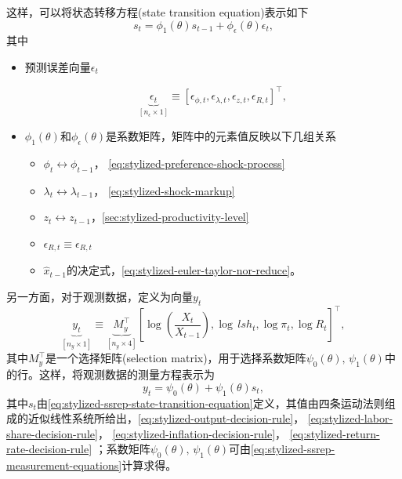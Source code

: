 这样，可以将状态转移方程(state transition equation)表示如下
\begin{equation}
  \label{eq:stylized-ssrep-state-transition-equation}
  s_{t} = \phi_{1} \left( \theta \right) s_{t-1} + \phi_{\epsilon} \left( \theta \right) \epsilon_{t},
\end{equation}
其中
\begin{itemize}
  \item  预测误差向量$\epsilon_{t}$

  \begin{equation*}
    \underbrace{
    \epsilon_{t}
    }_{\left[ n_{\epsilon} \times 1 \right]}
    \equiv \left[ \epsilon_{\phi,t}, \epsilon_{\lambda,t}, \epsilon_{z,t}, \epsilon_{R,t} \right]^{\top},
  \end{equation*}
    \item $\phi_{1} \left( \theta \right)$和$\phi_{\epsilon} \left( \theta \right)$是系数矩阵，矩阵中的元素值反映以下几组关系
    \begin{itemize}
      \item $\phi_{t} \leftrightarrow \phi_{t-1}$， \eqref{eq:stylized-preference-shock-process}
      \item $\lambda_{t} \leftrightarrow \lambda_{t-1}$， \eqref{eq:stylized-shock-markup}
      \item $z_{t} \leftrightarrow z_{t-1}$，\eqref{sec:stylized-productivity-level}
      \item $\epsilon_{R,t} \equiv \epsilon_{R,t}$
      \item $\hat{x}_{t-1}$的决定式，\eqref{eq:stylized-euler-taylor-nor-reduce}。
    \end{itemize}
\end{itemize}

另一方面，对于观测数据，定义为向量$y_{t}$
\begin{equation}
  \label{eq:stylized-observed-vector-y}
  \underbrace{
  y_{t}
  }_{\left[ n_{y} \times 1 \right]}
   \equiv
   \underbrace{
   M_{y}^{\top}
   }_{\left[ n_{y} \times 4 \right]}
  \left[
  \log \left( \frac{X_{t}}{X_{t-1}} \right), \log \, lsh_{t}, \log \pi_{t}, \log R_{t}
  \right]^{\top},
\end{equation}
其中$M_{y}^{\top}$是一个选择矩阵(selection matrix)，用于选择系数矩阵$\psi_{0} \left( \theta \right), \, \psi_{1} \left( \theta \right)$中的行。这样，将观测数据的测量方程表示为
\begin{equation}
  \label{eq:stylized-observed-measurement-equation}
  y_{t} = \psi_{0} \left( \theta \right) + \psi_{1} \left( \theta \right) s_{t},
\end{equation}
其中$s_{t}$由\eqref{eq:stylized-ssrep-state-transition-equation}定义，其值由四条运动法则组成的近似线性系统所给出，\eqref{eq:stylized-output-decision-rule}，
\eqref{eq:stylized-labor-share-decision-rule}，
\eqref{eq:stylized-inflation-decision-rule}，
\eqref{eq:stylized-return-rate-decision-rule}
；系数矩阵$  \psi_{0} \left( \theta \right), \, \psi_{1} \left( \theta \right) $可由\eqref{eq:stylized-ssrep-measurement-equations}计算求得。

